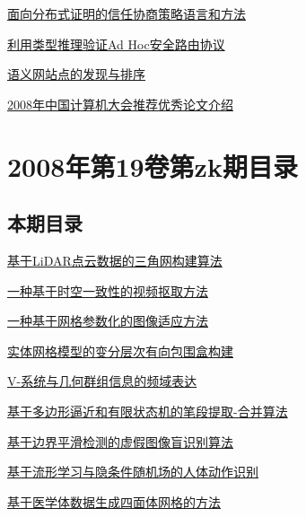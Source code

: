 \documentclass[a4paper]{article}
\begin{document}
\href{http://www.jos.org.cn/ch/reader/download_pdf.aspx?file_no=3491&year_id=2009&quarter_id=10&falg=1}{面向分布式证明的信任协商策略语言和方法}

\href{http://www.jos.org.cn/ch/reader/download_pdf.aspx?file_no=3504&year_id=2009&quarter_id=10&falg=1}{利用类型推理验证Ad Hoc安全路由协议}

\href{http://www.jos.org.cn/ch/reader/download_pdf.aspx?file_no=3505&year_id=2009&quarter_id=10&falg=1}{语义网站点的发现与排序}

\href{http://www.jos.org.cn/ch/reader/download_pdf.aspx?file_no=3712&year_id=2009&quarter_id=10&falg=1}{2008年中国计算机大会推荐优秀论文介绍}


\section{\textbf{2008年第19卷第zk期目录}}
\subsection{本期目录}
\href{http://www.jos.org.cn/ch/reader/download_pdf.aspx?file_no=2008s101&year_id=2008&quarter_id=zk&falg=1}{基于LiDAR点云数据的三角网构建算法}

\href{http://www.jos.org.cn/ch/reader/download_pdf.aspx?file_no=2008s102&year_id=2008&quarter_id=zk&falg=1}{一种基于时空一致性的视频抠取方法}

\href{http://www.jos.org.cn/ch/reader/download_pdf.aspx?file_no=2008s103&year_id=2008&quarter_id=zk&falg=1}{一种基于网格参数化的图像适应方法}

\href{http://www.jos.org.cn/ch/reader/download_pdf.aspx?file_no=2008s104&year_id=2008&quarter_id=zk&falg=1}{实体网格模型的变分层次有向包围盒构建}

\href{http://www.jos.org.cn/ch/reader/download_pdf.aspx?file_no=2008s105&year_id=2008&quarter_id=zk&falg=1}{V-系统与几何群组信息的频域表达}

\href{http://www.jos.org.cn/ch/reader/download_pdf.aspx?file_no=2008s106&year_id=2008&quarter_id=zk&falg=1}{基于多边形逼近和有限状态机的笔段提取-合并算法}

\href{http://www.jos.org.cn/ch/reader/download_pdf.aspx?file_no=2008s107&year_id=2008&quarter_id=zk&falg=1}{基于边界平滑检测的虚假图像盲识别算法}

\href{http://www.jos.org.cn/ch/reader/download_pdf.aspx?file_no=2008s108&year_id=2008&quarter_id=zk&falg=1}{基于流形学习与隐条件随机场的人体动作识别}

\href{http://www.jos.org.cn/ch/reader/download_pdf.aspx?file_no=2008s109&year_id=2008&quarter_id=zk&falg=1}{基于医学体数据生成四面体网格的方法}
\end{document}
